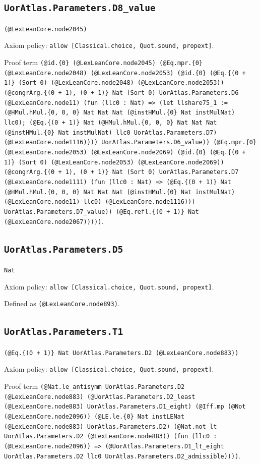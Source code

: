 \documentclass[11pt]{article}
\begin{document}
\subsection*{\texttt{UorAtlas.Parameters.D8\_value}}
\noindent\texttt{(@LexLeanCore.node2045)}\par
\noindent Axiom policy: \texttt{allow [Classical.choice, Quot.sound, propext]}.\par
\noindent Proof term \texttt{(@id.\{0\} (@LexLeanCore.node2045) (@Eq.mpr.\{0\} (@LexLeanCore.node2048) (@LexLeanCore.node2053) (@id.\{0\} (@Eq.\{(0 + 1)\} (Sort 0) (@LexLeanCore.node2048) (@LexLeanCore.node2053)) (@congrArg.\{(0 + 1), (0 + 1)\} Nat (Sort 0) UorAtlas.Parameters.D6 (@LexLeanCore.node11) (fun (llc0 : Nat) => (let llshare75\_1 := (@HMul.hMul.\{0, 0, 0\} Nat Nat Nat (@instHMul.\{0\} Nat instMulNat) llc0); (@Eq.\{(0 + 1)\} Nat (@HMul.hMul.\{0, 0, 0\} Nat Nat Nat (@instHMul.\{0\} Nat instMulNat) llc0 UorAtlas.Parameters.D7) (@LexLeanCore.node1116)))) UorAtlas.Parameters.D6\_value)) (@Eq.mpr.\{0\} (@LexLeanCore.node2053) (@LexLeanCore.node2069) (@id.\{0\} (@Eq.\{(0 + 1)\} (Sort 0) (@LexLeanCore.node2053) (@LexLeanCore.node2069)) (@congrArg.\{(0 + 1), (0 + 1)\} Nat (Sort 0) UorAtlas.Parameters.D7 (@LexLeanCore.node1111) (fun (llc0 : Nat) => (@Eq.\{(0 + 1)\} Nat (@HMul.hMul.\{0, 0, 0\} Nat Nat Nat (@instHMul.\{0\} Nat instMulNat) (@LexLeanCore.node11) llc0) (@LexLeanCore.node1116))) UorAtlas.Parameters.D7\_value)) (@Eq.refl.\{(0 + 1)\} Nat (@LexLeanCore.node2067)))))}.\par
\subsection*{\texttt{UorAtlas.Parameters.D5}}
\noindent\texttt{Nat}\par
\noindent Axiom policy: \texttt{allow [Classical.choice, Quot.sound, propext]}.\par
\noindent Defined as \texttt{(@LexLeanCore.node893)}.\par
\subsection*{\texttt{UorAtlas.Parameters.T1}}
\noindent\texttt{(@Eq.\{(0 + 1)\} Nat UorAtlas.Parameters.D2 (@LexLeanCore.node883))}\par
\noindent Axiom policy: \texttt{allow [Classical.choice, Quot.sound, propext]}.\par
\noindent Proof term \texttt{(@Nat.le\_antisymm UorAtlas.Parameters.D2 (@LexLeanCore.node883) (@UorAtlas.Parameters.D2\_least (@LexLeanCore.node883) UorAtlas.Parameters.D1\_eight) (@Iff.mp (@Not (@LexLeanCore.node2096)) (@LE.le.\{0\} Nat instLENat (@LexLeanCore.node883) UorAtlas.Parameters.D2) (@Nat.not\_lt UorAtlas.Parameters.D2 (@LexLeanCore.node883)) (fun (llc0 : (@LexLeanCore.node2096)) => (@UorAtlas.Parameters.D1\_lt\_eight UorAtlas.Parameters.D2 llc0 UorAtlas.Parameters.D2\_admissible))))}.\par
\end{document}
